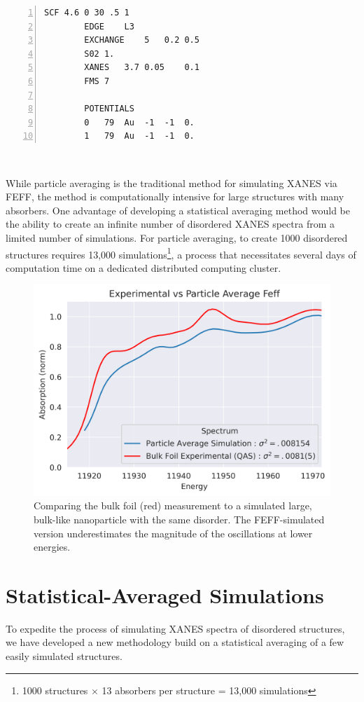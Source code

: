 \vspace{2em}
\begin{minipage}{\linewidth}
	\begin{Verbatim}[samepage=true, numbers=left]
		SCF 4.6 0 30 .5 1
		EDGE    L3
		EXCHANGE    5   0.2 0.5
		S02 1.
		XANES   3.7 0.05    0.1
		FMS 7
	
		POTENTIALS
		0	79	Au	-1	-1	0.
		1	79	Au	-1	-1	0.
	\end{Verbatim}
	~
	\end{minipage}

While particle averaging is the traditional method for simulating XANES via FEFF, the method is computationally intensive for large structures with many absorbers. One advantage of developing a statistical averaging method would be the ability to create an infinite number of disordered XANES spectra from a limited number of simulations. For particle averaging, to create 1000 disordered structures requires 13,000 simulations\footnote{1000 structures $ \times $ 13 absorbers per structure = 13,000 simulations}, a process that necessitates several days of computation time on a dedicated distributed computing cluster.



\begin{figure}[h!]
	\centering
	\includegraphics[width=.7\linewidth]{Chapters/Figures/Bulk_experimental_vs_pa_comparison.png}
	\caption[Simulation vs. Experimental 3]{Comparing the bulk foil (red) measurement to a simulated large, bulk-like nanoparticle with the same disorder. The FEFF-simulated version underestimates the magnitude of the oscillations at lower energies.}
	\label{fig:avg-experimental-vs-simulation2}
\end{figure}

\section{Statistical-Averaged Simulations}
To expedite the process of simulating XANES spectra of disordered structures, we have developed a new methodology build on a statistical averaging of a few easily simulated structures.

